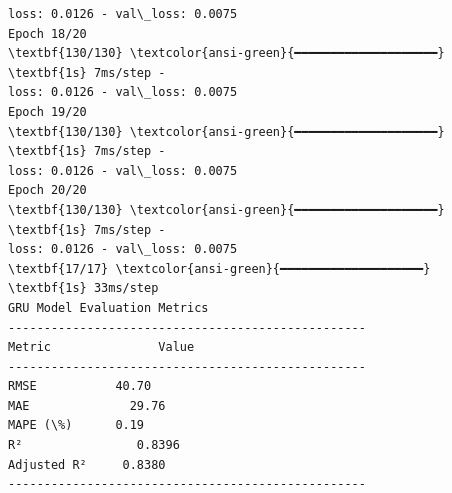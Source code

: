 \documentclass[11pt]{article}
\begin{document}
\begin{Verbatim}[commandchars=\\\{\}]
loss: 0.0126 - val\_loss: 0.0075
Epoch 18/20
\textbf{130/130} \textcolor{ansi-green}{━━━━━━━━━━━━━━━━━━━━} \textbf{1s} 7ms/step -
loss: 0.0126 - val\_loss: 0.0075
Epoch 19/20
\textbf{130/130} \textcolor{ansi-green}{━━━━━━━━━━━━━━━━━━━━} \textbf{1s} 7ms/step -
loss: 0.0126 - val\_loss: 0.0075
Epoch 20/20
\textbf{130/130} \textcolor{ansi-green}{━━━━━━━━━━━━━━━━━━━━} \textbf{1s} 7ms/step -
loss: 0.0126 - val\_loss: 0.0075
\textbf{17/17} \textcolor{ansi-green}{━━━━━━━━━━━━━━━━━━━━} \textbf{1s} 33ms/step
GRU Model Evaluation Metrics
--------------------------------------------------
Metric               Value
--------------------------------------------------
RMSE           40.70
MAE              29.76
MAPE (\%)      0.19
R²                0.8396
Adjusted R²     0.8380
--------------------------------------------------
    \end{Verbatim}

    \begin{center}
    \end{center}
    { \hspace*{\fill} \\}
    
\end{document}
